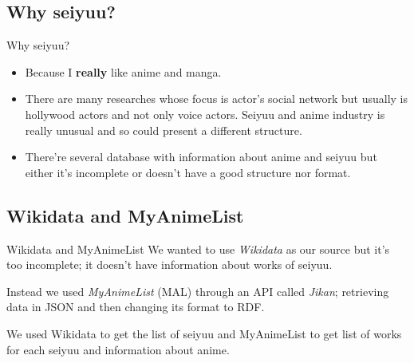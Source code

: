 \subsection{Why seiyuu?}
\begin{frame}{Why seiyuu?}
\begin{itemize}
\item Because I \textbf{really} like anime and manga.

\item There are many researches whose focus is actor's social network but usually is hollywood actors and not only voice actors. Seiyuu and anime industry is really unusual and so could present a different structure.

\item There're several database with information about anime and seiyuu but either it's incomplete or doesn't have a good structure nor format.
\end{itemize}
\end{frame}

\subsection{Wikidata and MyAnimeList}
\begin{frame}{Wikidata and MyAnimeList}
We wanted to use \emph{Wikidata} as our source but it's too incomplete; it doesn't have information about works of seiyuu.
\vspace{15pt}

Instead we used \emph{MyAnimeList} (MAL) through an API called \emph{Jikan}; retrieving data in JSON and then changing its format to RDF.
\vspace{15pt}

We used Wikidata to get the list of seiyuu and MyAnimeList to get list of works for each seiyuu and information about anime.
\end{frame}

